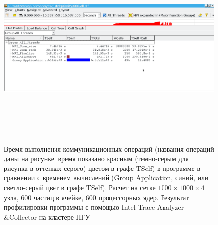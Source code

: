 \begin{figure}[h]
	\begin{center}
		\includegraphics[height=10cm,keepaspectratio]{images/scalingNSU-img21.png}
		\caption{
		Время выполнения коммуникационных операций (названия операций даны на рисунке, время показано красным (темно-серым для рисунка в оттенках серого) цветом в графе TSelf) в программе в сравнении с временем вычислений (Group Application, синий, или светло-серый цвет в графе TSelf). Расчет на сетке $1000 \times 1000 \times 4$ узла, 600 частиц в ячейке, 600 процессорных ядер. Результат профилировки программы с помощью Intel Trace Analyzer \&Collector на кластере НГУ
		}
		\label{scale10}
	\end{center} 
\end{figure}
	 

	    
	   
